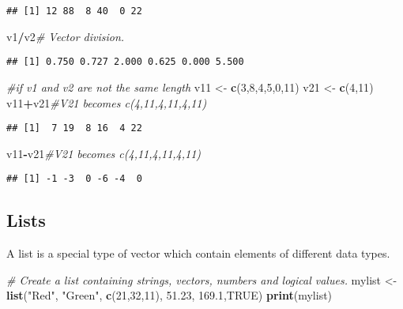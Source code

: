 \documentclass[]{book}
\newenvironment{Shaded}{\begin{snugshade}}{\end{snugshade}}
\newcommand{\KeywordTok}[1]{\textcolor[rgb]{0.13,0.29,0.53}{\textbf{#1}}}
\newcommand{\DecValTok}[1]{\textcolor[rgb]{0.00,0.00,0.81}{#1}}
\newcommand{\FloatTok}[1]{\textcolor[rgb]{0.00,0.00,0.81}{#1}}
\newcommand{\StringTok}[1]{\textcolor[rgb]{0.31,0.60,0.02}{#1}}
\newcommand{\CommentTok}[1]{\textcolor[rgb]{0.56,0.35,0.01}{\textit{#1}}}
\newcommand{\OtherTok}[1]{\textcolor[rgb]{0.56,0.35,0.01}{#1}}
\newcommand{\OperatorTok}[1]{\textcolor[rgb]{0.81,0.36,0.00}{\textbf{#1}}}
\newcommand{\NormalTok}[1]{#1}
\theoremstyle{definition}
\theoremstyle{definition}
\theoremstyle{definition}
\theoremstyle{remark}
\begin{document}
\begin{verbatim}
## [1] 12 88  8 40  0 22
\end{verbatim}

\begin{Shaded}
\begin{Highlighting}[]
\NormalTok{v1}\OperatorTok{/}\NormalTok{v2}\CommentTok{# Vector division.}
\end{Highlighting}
\end{Shaded}

\begin{verbatim}
## [1] 0.750 0.727 2.000 0.625 0.000 5.500
\end{verbatim}

\begin{Shaded}
\begin{Highlighting}[]
\CommentTok{#if v1 and v2 are not the same length}
\NormalTok{v11 <-}\StringTok{ }\KeywordTok{c}\NormalTok{(}\DecValTok{3}\NormalTok{,}\DecValTok{8}\NormalTok{,}\DecValTok{4}\NormalTok{,}\DecValTok{5}\NormalTok{,}\DecValTok{0}\NormalTok{,}\DecValTok{11}\NormalTok{)}
\NormalTok{v21 <-}\StringTok{ }\KeywordTok{c}\NormalTok{(}\DecValTok{4}\NormalTok{,}\DecValTok{11}\NormalTok{)}
\NormalTok{v11}\OperatorTok{+}\NormalTok{v21}\CommentTok{#V21 becomes c(4,11,4,11,4,11)}
\end{Highlighting}
\end{Shaded}

\begin{verbatim}
## [1]  7 19  8 16  4 22
\end{verbatim}

\begin{Shaded}
\begin{Highlighting}[]
\NormalTok{v11}\OperatorTok{-}\NormalTok{v21}\CommentTok{#V21 becomes c(4,11,4,11,4,11)}
\end{Highlighting}
\end{Shaded}

\begin{verbatim}
## [1] -1 -3  0 -6 -4  0
\end{verbatim}

\subsection{Lists}\label{lists}

A list is a special type of vector which contain elements of different
data types.

\begin{Shaded}
\begin{Highlighting}[]
\CommentTok{# Create a list containing strings,  vectors, numbers and logical values.}
\NormalTok{mylist <-}\StringTok{ }\KeywordTok{list}\NormalTok{(}\StringTok{"Red"}\NormalTok{, }\StringTok{"Green"}\NormalTok{, }\KeywordTok{c}\NormalTok{(}\DecValTok{21}\NormalTok{,}\DecValTok{32}\NormalTok{,}\DecValTok{11}\NormalTok{),  }\FloatTok{51.23}\NormalTok{, }\FloatTok{169.1}\NormalTok{,}\OtherTok{TRUE}\NormalTok{)}
\KeywordTok{print}\NormalTok{(mylist)}
\end{Highlighting}
\end{Shaded}
\end{document}
